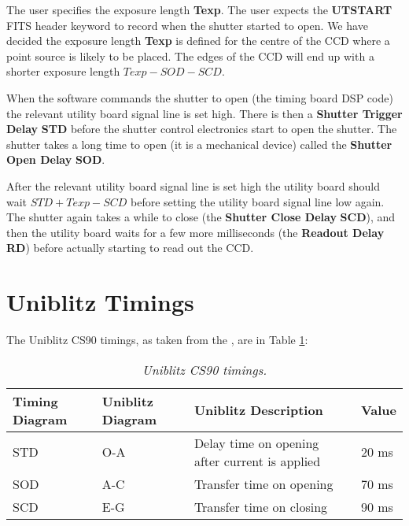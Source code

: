 \documentclass[10pt,a4paper]{article}
\begin{document}
The user specifies the exposure length {\bf Texp}. The user expects the {\bf UTSTART} FITS header keyword to record
when the shutter started to open. We have decided the exposure length {\bf Texp} is defined for the centre of the CCD
where a point source is likely to be placed. The edges of the CCD will end up with a shorter exposure length 
{\bf $Texp - SOD - SCD$}.

When the software commands the shutter to open (the timing board DSP code) the relevant utility board signal line is set high. There is then a {\bf Shutter Trigger Delay} {\bf STD} before the shutter control electronics start to open the 
shutter. The shutter takes a long time to open (it is a mechanical device) called the {\bf Shutter Open Delay} {\bf SOD}. 

After the relevant utility board signal line is set high the utility board should wait {\bf $STD + Texp - SCD$} before
setting the utility board signal line low again. The shutter again takes a while to close (the {\bf Shutter Close Delay} {\bf SCD}), and then the utility board waits for a few more milliseconds (the {\bf Readout Delay} {\bf RD}) before actually starting to read out the CCD.

\section{Uniblitz Timings}

The Uniblitz CS90 timings, as taken from the \cite{bib:uniblitzcs90spec}, are in Table \ref{tab:uniblitzcs90time}:

\begin{table}[!h]
\begin{center}
\begin{tabular}{|l|l|p{15em}|l|}
\hline
{\bf Timing Diagram} & {\bf Uniblitz Diagram} & {\bf Uniblitz Description} & {\bf Value} \\ \hline
STD                  & O-A		      & Delay time on opening after current is applied & 20 ms \\ 
SOD                  & A-C                    & Transfer time on opening                       & 70 ms \\ 
SCD                  & E-G                    & Transfer time on closing                       & 90 ms \\ \hline
\end{tabular}
\end{center}
\caption{\em Uniblitz CS90 timings.}
\label{tab:uniblitzcs90time}
\end{table}
\end{document}
